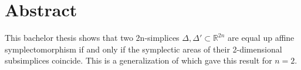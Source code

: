 \documentclass[../SymplecticSimplices.tex]{subfiles}
\begin{document}
\section*{Abstract}
This bachelor thesis shows that two 2n-simplices \( \Delta, \Delta' \subset \mathbb{R}^{2n} \) are equal up affine symplectomorphism if and only if the symplectic areas of their 2-dimensional subsimplices coincide. This is a generalization of \cite{cieliebak} which gave this result for \( n = 2 \).
\end{document}
